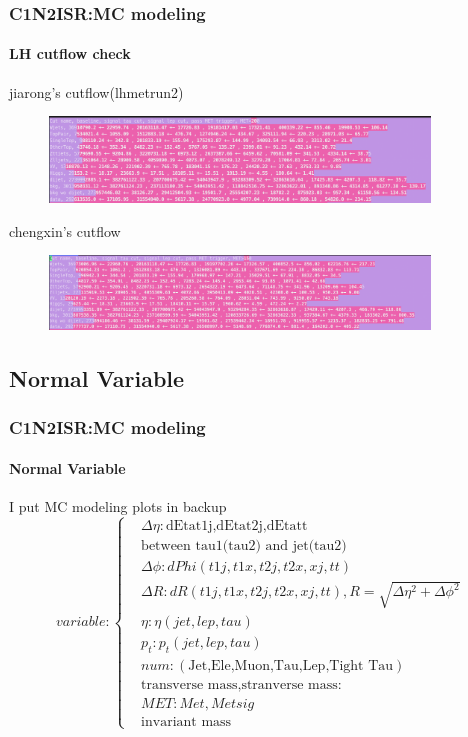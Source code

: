 \documentclass[usenames,dvipsnames]{beamer}
\begin{document}
\begin{frame}
\frametitle{C1N2ISR:MC modeling}
\framesubtitle{LH cutflow check}
jiarong's cutflow(lhmetrun2)
\begin{figure}
	\centering
	\includegraphics[width = 0.9\textwidth]{graphics/jiaronglhcutflow}
	\label{jiarong's lh cutflow}
\end{figure}
chengxin's cutflow
\begin{figure}
	\centering
	\includegraphics[width = 0.9\textwidth]{graphics/chengxinlhcutflow}
	\label{chengxin's lh cutflow}
\end{figure}
\end{frame}

\subsection{Normal Variable}
\begin{frame}
	\frametitle{C1N2ISR:MC modeling}
	\framesubtitle{Normal Variable}
	I put MC modeling plots in backup
\begin{equation*}
	variable:\left\{
	\begin{split}
		&\Delta\eta:\text{dEtat1j,dEtat2j,dEtatt}\\ 
		&\text{between tau1(tau2) and jet(tau2)}\\
		&\Delta\phi:dPhi(t1j,t1x,t2j,t2x,xj,tt)\\
		&\Delta R:dR(t1j,t1x,t2j,t2x,xj,tt),R = \sqrt{\Delta\eta^2 + \Delta\phi^2}\\
		&\eta:\eta(jet,lep,tau)\\
		&p_t:p_t(jet,lep,tau)\\
		&num:(\text{Jet,Ele,Muon,Tau,Lep,Tight Tau})\\
		&\text{transverse mass,stranverse mass:}\\
		&MET:Met, Metsig\\
		&\text{invariant mass}
	\end{split}
	\right.
\end{equation*}
\end{frame}
\end{document}
